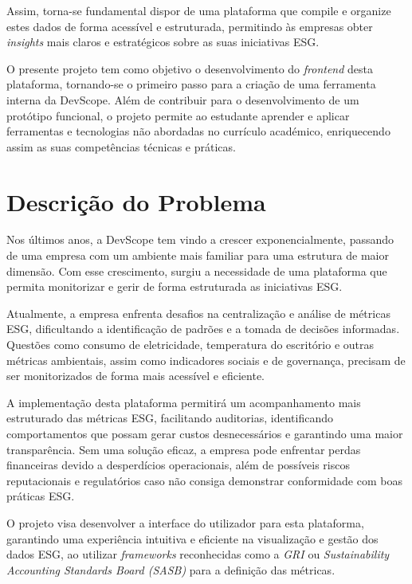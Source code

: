 Assim, torna-se fundamental dispor de uma plataforma que compile e organize estes dados de forma acessível e estruturada, permitindo às empresas obter \textit{insights} mais claros e estratégicos sobre as suas iniciativas \gls{ESG}.

O presente projeto tem como objetivo o desenvolvimento do \textit{frontend} desta plataforma, tornando-se o primeiro passo para a criação de uma ferramenta interna da DevScope. Além de contribuir para o desenvolvimento de um protótipo funcional, o projeto permite ao estudante aprender e aplicar ferramentas e tecnologias não abordadas no currículo académico, enriquecendo assim as suas competências técnicas e práticas.


\section{Descrição do Problema}

Nos últimos anos, a DevScope tem vindo a crescer exponencialmente, passando de uma empresa com um ambiente mais familiar para uma estrutura de maior dimensão. Com esse crescimento, surgiu a necessidade de uma plataforma que permita monitorizar e gerir de forma estruturada as iniciativas \gls{ESG}.

Atualmente, a empresa enfrenta desafios na centralização e análise de métricas \gls{ESG}, dificultando a identificação de padrões e a tomada de decisões informadas. Questões como consumo de eletricidade, temperatura do escritório e outras métricas ambientais, assim como indicadores sociais e de governança, precisam de ser monitorizados de forma mais acessível e eficiente.

A implementação desta plataforma permitirá um acompanhamento mais estruturado das métricas \gls{ESG}, facilitando auditorias, identificando comportamentos que possam gerar custos desnecessários e garantindo uma maior transparência. Sem uma solução eficaz, a empresa pode enfrentar perdas financeiras devido a desperdícios operacionais, além de possíveis riscos reputacionais e regulatórios caso não consiga demonstrar conformidade com boas práticas \gls{ESG}.

O projeto visa desenvolver a interface do utilizador para esta plataforma, garantindo uma experiência intuitiva e eficiente na visualização e gestão dos dados \gls{ESG}, ao utilizar \textit{frameworks} reconhecidas como a \textit{\gls{GRI}} ou \textit{Sustainability Accounting Standards Board (SASB)} para a definição das métricas.


